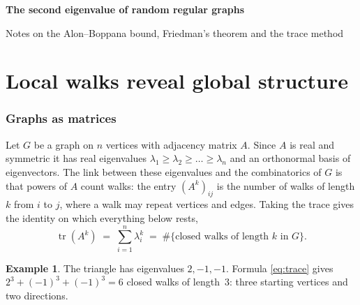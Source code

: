 \documentclass[11pt,letterpaper]{article}
\theoremstyle{definition}
\newtheorem{example}[theorem]{Example}
\theoremstyle{remark}
\DeclareMathOperator{\tr}{tr}
\newcommand{\edge}{2\sqrt{d-1}}
\newcommand{\eps}{\varepsilon}
\begin{document}
\begin{center}
  {\LARGE\bfseries The second eigenvalue of random regular graphs\par}
  \vspace{6pt}
  {\large Notes on the Alon--Boppana bound, Friedman's theorem and the trace method\par}
\end{center}
\vspace{10pt}

\begin{abstract}
\noindent
A random $d$-regular graph has all of its non-trivial adjacency eigenvalues in the interval
$[-\edge-\eps,\ \edge+\eps]$ with high probability, and no large $d$-regular graph can do
better. These notes explain why $\edge$ is the barrier, why it is hard to prove that random
graphs reach it, and how the known proofs get around the difficulty. The emphasis is on
motivation and on the shape of the arguments; proofs are sketched, not given in full.
\end{abstract}

\part{Local walks reveal global structure}
\section{Graphs as matrices}

Let $G$ be a graph on $n$ vertices with adjacency matrix $A$. Since $A$ is real and symmetric it
has real eigenvalues $\lambda_1\ge\lambda_2\ge\dots\ge\lambda_n$ and an orthonormal basis of
eigenvectors. The link between these eigenvalues and the combinatorics of $G$ is that powers of
$A$ count walks: the entry $(A^k)_{ij}$ is the number of walks of length $k$ from $i$ to $j$, where
a walk may repeat vertices and edges. Taking the trace gives the identity on which everything
below rests,
\begin{equation}\label{eq:trace}
  \tr(A^k)\;=\;\sum_{i=1}^{n}\lambda_i^{k}\;=\;\#\{\text{closed walks of length }k\text{ in }G\}.
\end{equation}

\begin{example}
The triangle has eigenvalues $2,-1,-1$. Formula \eqref{eq:trace} gives $2^3+(-1)^3+(-1)^3=6$
closed walks of length~$3$: three starting vertices and two directions.
\end{example}
\end{document}
